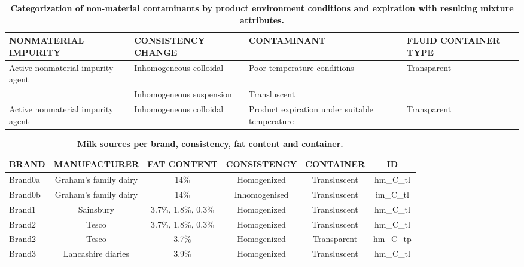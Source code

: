 \documentclass[12pt,a4paper,oneside]{report}
\begin{document}
\begin{table}[H]
\centering
\footnotesize
\begin{tabularx}{\textwidth}{X X X X}
\hline
\textbf{NONMATERIAL IMPURITY} & \textbf{CONSISTENCY CHANGE} & \textbf{CONTAMINANT} & \textbf{FLUID CONTAINER TYPE} \\
\hline
Active nonmaterial impurity agent & Inhomogeneous colloidal & Poor temperature conditions & Transparent \\
 & Inhomogeneous suspension & Transluscent &  \\
Active nonmaterial impurity agent & Inhomogeneous colloidal & Product expiration under suitable temperature & Transparent \\
\hline
\end{tabularx}
\caption[Categorization of non-material contaminants.]{\textbf{Categorization of non-material contaminants by product environment conditions and expiration with resulting mixture attributes.}}
\label{tab:6_5}
\end{table}

\begin{table}[H]
\centering
\footnotesize
\begin{tabular}{lccccc}
\hline
\textbf{BRAND} & \textbf{MANUFACTURER} & \textbf{FAT CONTENT} & \textbf{CONSISTENCY} & \textbf{CONTAINER} & \textbf{ID} \\
\hline
Brand0a & Graham's family dairy & 14\% & Homogenized & Transluscent & hm\_C\_tl \\
Brand0b & Graham's family dairy & 14\% & Inhomogenised & Transluscent & im\_C\_tl \\
Brand1 & Sainsbury & 3.7\%, 1.8\%, 0.3\% & Homogenized & Transluscent & hm\_C\_tl \\
Brand2 & Tesco & 3.7\%, 1.8\%, 0.3\% & Homogenized & Transluscent & hm\_C\_tl \\
Brand2 & Tesco & 3.7\% & Homogenized & Transparent & hm\_C\_tp \\
Brand3 & Lancashire diaries & 3.9\% & Homogenized & Transluscent & hm\_C\_tl \\
\hline
\end{tabular}
\caption[Milk sources per brand, consistency, fat content and container.]{\textbf{Milk sources per brand, consistency, fat content and container.}}
\label{tab:6_6}
\end{table}
\end{document}
